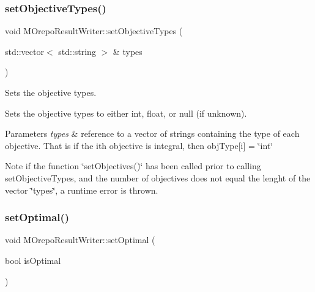 \subsubsection{\texorpdfstring{set\+Objective\+Types()}{setObjectiveTypes()}}
{\footnotesize\ttfamily void M\+Orepo\+Result\+Writer\+::set\+Objective\+Types (\begin{DoxyParamCaption}\item[{std\+::vector$<$ std\+::string $>$ \&}]{types }\end{DoxyParamCaption})}



Sets the objective types. 

Sets the objective types to either int, float, or null (if unknown). 
\begin{DoxyParams}{Parameters}
{\em types} & reference to a vector of strings containing the type of each objective. That is if the i\textquotesingle{}th objective is integral, then obj\+Type\mbox{[}i\mbox{]} = \char`\"{}int\char`\"{} \\
\hline
\end{DoxyParams}
\begin{DoxyNote}{Note}
if the function \char`\"{}set\+Objectives()\char`\"{} has been called prior to calling set\+Objective\+Types, and the number of objectives does not equal the lenght of the vector \char`\"{}types\char`\"{}, a runtime error is thrown. 
\end{DoxyNote}
\mbox{\label{class_m_orepo_result_writer_acfb0a96e01d3f5ed405d24f2ce0b1c3e}} 
\subsubsection{\texorpdfstring{set\+Optimal()}{setOptimal()}}
{\footnotesize\ttfamily void M\+Orepo\+Result\+Writer\+::set\+Optimal (\begin{DoxyParamCaption}\item[{bool}]{is\+Optimal }\end{DoxyParamCaption})\hspace{0.3cm}{\ttfamily [inline]}}

